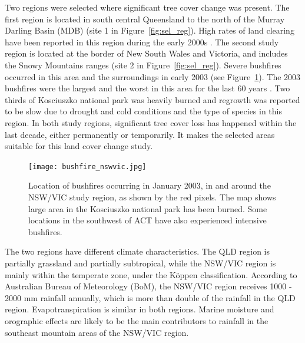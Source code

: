 \documentclass[draft,linenumbers]{agujournal}
\begin{document}
\begin{article}
Two regions were selected where significant tree cover change was present. The first region is located in south central Queensland to the north of the Murray Darling Basin (MDB) (site 1 in Figure~\ref{fig:sel_reg}). High rates of land clearing have been reported in this region during the early 2000s \citep{SLATS2004}. The second study region is located at the border of New South Wales and Victoria, and includes the Snowy Mountains ranges (site 2 in Figure~\ref{fig:sel_reg}). Severe bushfires occurred in this area and the surroundings in early 2003 (see Figure~\ref{fig:bushfire}). The 2003 bushfires were the largest and the worst in this area for the last 60 years \citep{Fire2011}. Two thirds of Kosciuszko national park was heavily burned and regrowth was reported to be slow due to drought and cold conditions \citep{ABC2003} and the type of species in this region. In both study regions, significant tree cover loss has happened within the last decade, either permanently or temporarily. It makes the selected areas suitable for this land cover change study. 

\begin{figure}[htp]
  \centering
  \texttt{[image: bushfire\_nswvic.jpg]}
  \caption{Location of bushfires occurring in January 2003, in and around the NSW/VIC study region, as shown by the red pixels. The map shows large area in the Kosciuszko national park has been burned. Some locations in the southwest of ACT have also experienced intensive bushfires.}
  \label{fig:bushfire}
\end{figure}

The two regions have different climate characteristics. The QLD region is partially grassland and partially subtropical, while the NSW/VIC region is mainly within the temperate zone, under the K\"{o}ppen classification. According to Australian Bureau of Meteorology (BoM), the NSW/VIC region receives 1000 - 2000 mm rainfall annually, which is more than double of the rainfall in the QLD region. Evapotranspiration is similar in both regions. Marine moisture and orographic effects are likely to be the main contributors to rainfall in the southeast mountain areas of the NSW/VIC region. 


\end{article}
\end{document}
